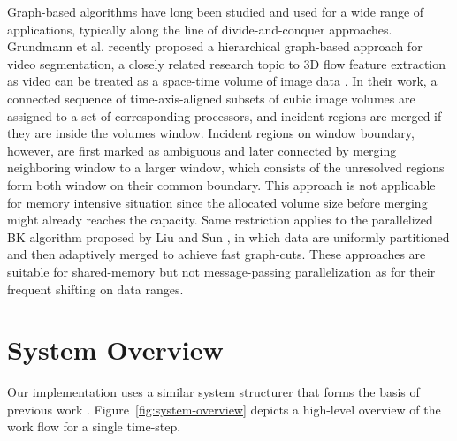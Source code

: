 \documentclass[10pt, conference, compsocconf]{IEEEtran}
\begin{document}
Graph-based algorithms have long been studied and used for a wide range of applications, typically along the line of divide-and-conquer approaches.
Grundmann et al. \cite{Grundmann2010} recently proposed a hierarchical graph-based approach for video segmentation, a closely related research topic to 3D flow feature extraction as video can be treated as a space-time volume of image data \cite{Klein2002}. In their work, a connected sequence of time-axis-aligned subsets of cubic image volumes are assigned to a set of corresponding processors, and incident regions are merged if they are inside the volumes window. Incident regions on window boundary, however, are first marked as ambiguous and later connected by merging neighboring window to a larger window, which consists of the unresolved regions form both window on their common boundary. This approach is not applicable for memory intensive situation since the allocated volume size before merging might already reaches the capacity. Same restriction applies to the parallelized BK algorithm \cite{Boykov2004} proposed by Liu and Sun \cite{Liu2010}, in which data are uniformly partitioned and then adaptively merged to achieve fast graph-cuts. These approaches are suitable for shared-memory but not message-passing parallelization as for their frequent shifting on data ranges. 

\section{System Overview}
Our implementation uses a similar system structurer that forms the basis of previous work \cite{Muelder2009}. Figure~\ref{fig:system-overview} depicts a high-level overview of the work flow for a single time-step. 
\end{document}
